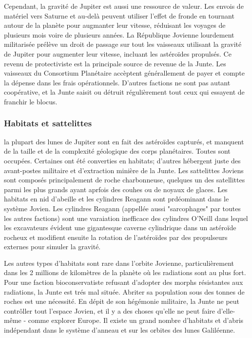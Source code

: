 Cependant, la gravité de Jupiter est aussi une ressource de valeur. Les envois de matériel vers Saturne et au-delà peuvent utiliser l'effet de fronde en tournant autour de la planète pour augmanter leur vitesse, réduisant les voyages de plusieurs mois voire de plusieurs années. La République Jovienne lourdement militarisée prélève un droit de passage sur tout les vaisseaux utilisant la gravité de Jupiter pour augmenter leur vitesse, incluant les astéroïdes propulsés. Ce revenu de protectiviste est la principale source de revenue de la Junte. Les vaisseaux du Consortium Planétaire accèptent générallement de payer et compte la dépense dans les frais opérationnels. D'autres factions ne sont pas autant coopérative, et la Junte saisit ou détruit régulièrement tout ceux qui essayent de franchir le blocus. 

\subsubsection{Habitats et sattelittes} \label{sec:habitats-moonlets} 

la plupart des lunes de Jupiter sont en fait des astéroïdes capturés, et manquent de la taille et de la complexité géologique des corps planétaires. Toutes sont occupées. Certaines ont été converties en habitats; d'autres hébergent juste des avant-postes militaire et d'extraction minière de la Junte. Les sattelittes Joviens sont composés principalement de roche charbonneuse, quelques un des satellittes parmi les plus grands ayant aprfois des couhes ou de noyaux de glaces. Les habitats en nid d'abeille et les cylindres Reagann sont prdéominant dans le système Jovien. Les cylindres Reagann (appellée aussi "sarcophages" par toutes les autres factions) sont une varaiation inefficace des cylindres O'Neill dans lequel les excavateurs évident une gigantesque caverne cylindrique dans un astéroïde rocheux et modifient ensuite la rotation de l'astéroïdes par des propulseurs externes pour simuler la gravité. 

Les autres types d'habitats sont rare dans l'orbite Jovienne, particulièrement dans les 2 millions de kilomètres de la planète où les radiations sont au plus fort. Pour une faction bioconservatiste refusant d'adopter des morphs résistantes aux radiations, la Junte est trés mal située. Abriter sa population sous des tonnes de roches est une nécessité. En dépit de son hégémonie militaire, la Junte ne peut contrôller tout l'espace Jovien, et il y a des choses qu'elle ne peut faire d'elle-même - comme explorer Europe. Il existe un grand nombre d'habitats et d'abris indépendant dans le système d'anneau et sur les orbites des lunes Galiléenne. 

